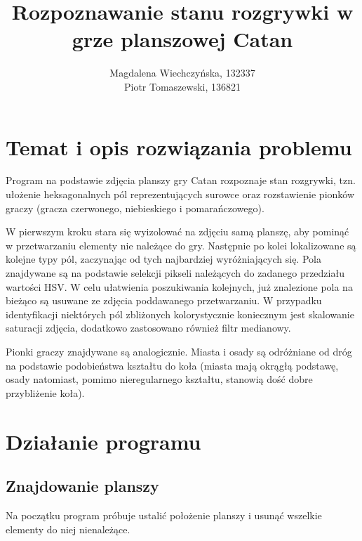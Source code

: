 \documentclass[a4paper]{article}
\title{Rozpoznawanie stanu rozgrywki w grze planszowej Catan}
\author{Magdalena Wiechczyńska, 132337\\
Piotr Tomaszewski, 136821}
\date{} %
\begin{document}
\maketitle

\section{Temat i opis rozwiązania problemu}
	Program na podstawie zdjęcia planszy gry Catan rozpoznaje stan rozgrywki, tzn. ułożenie heksagonalnych pól reprezentujących surowce oraz rozstawienie pionków graczy (gracza czerwonego, niebieskiego i pomarańczowego).
	
	W pierwszym kroku stara się wyizolować na zdjęciu samą planszę, aby pominąć w przetwarzaniu elementy nie należące do gry. Następnie po kolei lokalizowane są kolejne typy pól, zaczynając od
tych najbardziej wyróżniających się. Pola znajdywane są na podstawie selekcji pikseli należących
do zadanego przedziału wartości HSV. W celu ułatwienia poszukiwania kolejnych, już znalezione pola
na bieżąco są usuwane ze zdjęcia poddawanego przetwarzaniu. W przypadku identyfikacji niektórych pól zbliżonych kolorystycznie koniecznym jest skalowanie saturacji zdjęcia, dodatkowo zastosowano również filtr medianowy.

	Pionki graczy znajdywane są analogicznie. Miasta i osady są odróżniane od dróg na podstawie podobieństwa kształtu do koła (miasta mają okrągłą podstawę, osady natomiast, pomimo nieregularnego kształtu, stanowią dość dobre przybliżenie koła).

	
\section{Działanie programu}
    \subsection{Znajdowanie planszy}
     Na początku program próbuje ustalić położenie planszy i usunąć wszelkie elementy do niej nienależące.
\end{document}
